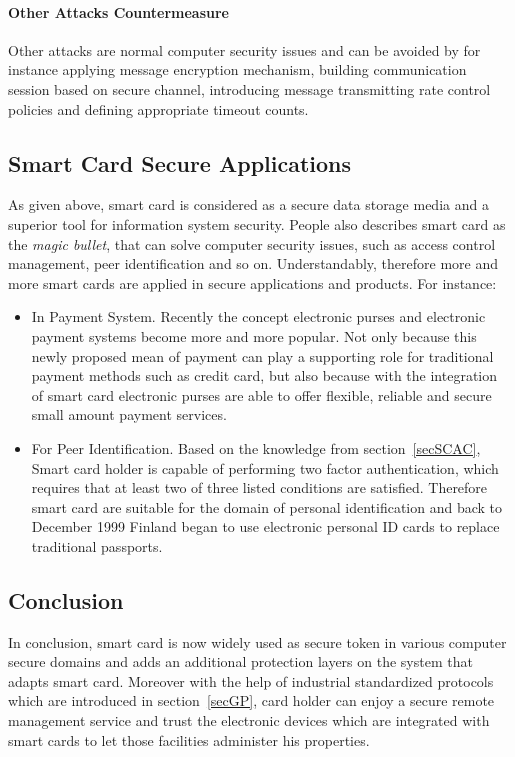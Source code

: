 \paragraph{Other Attacks Countermeasure}
Other attacks are normal computer security issues and can be avoided by for instance applying message encryption mechanism, building communication session based on secure channel, introducing message transmitting rate control policies and defining appropriate timeout counts.
\subsection{Smart Card Secure Applications}
As given above, smart card is considered as a secure data storage media and a superior tool for information system security. People also describes smart card as the \emph{magic bullet}, that can solve computer security issues, such as access control management, peer identification and so on. Understandably, therefore more and more smart cards are applied in secure applications and products. For instance:
\begin{itemize}
\item In Payment System. Recently the concept electronic purses and electronic payment systems become more and more popular. Not only because this newly proposed mean of payment can play a supporting role for traditional payment methods such as credit card, but also because with the integration of smart card electronic purses are able to offer flexible, reliable and secure  small amount payment services\cite{handbook}.
\item For Peer Identification. Based on the knowledge from section~\ref{secSCAC}, Smart card holder is  capable of performing two factor authentication\cite{smart_card_history}, which requires that at least two of three listed conditions are satisfied. Therefore smart card are suitable for the domain of personal identification and back to December 1999 Finland began to use electronic personal ID cards to replace traditional passports\cite{handbook}. 
\end{itemize}
\subsection{Conclusion}
In conclusion, smart card  is now widely used as secure token in various computer secure domains and adds an additional protection layers on the system that adapts smart card. Moreover with the help of industrial standardized protocols which are introduced in section~\ref{secGP}, card holder can enjoy a secure remote management service and trust the electronic devices which are integrated with smart cards to let those facilities administer his properties.  

